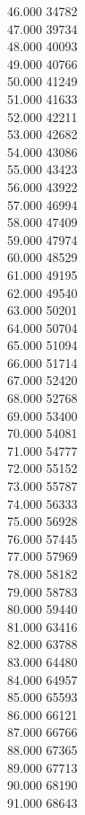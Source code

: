 { 46.000	34782 \\
 47.000	39734 \\
 48.000	40093 \\
 49.000	40766 \\
 50.000	41249 \\
 51.000	41633 \\
 52.000	42211 \\
 53.000	42682 \\
 54.000	43086 \\
 55.000	43423 \\
 56.000	43922 \\
 57.000	46994 \\
 58.000	47409 \\
 59.000	47974 \\
 60.000	48529 \\
 61.000	49195 \\
 62.000	49540 \\
 63.000	50201 \\
 64.000	50704 \\
 65.000	51094 \\
 66.000	51714 \\
 67.000	52420 \\
 68.000	52768 \\
 69.000	53400 \\
 70.000	54081 \\
 71.000	54777 \\
 72.000	55152 \\
 73.000	55787 \\
 74.000	56333 \\
 75.000	56928 \\
 76.000	57445 \\
 77.000	57969 \\
 78.000	58182 \\
 79.000	58783 \\
 80.000	59440 \\
 81.000	63416 \\
 82.000	63788 \\
 83.000	64480 \\
 84.000	64957 \\
 85.000	65593 \\
 86.000	66121 \\
 87.000	66766 \\
 88.000	67365 \\
 89.000	67713 \\
 90.000	68190 \\
 91.000	68643 \\
}
